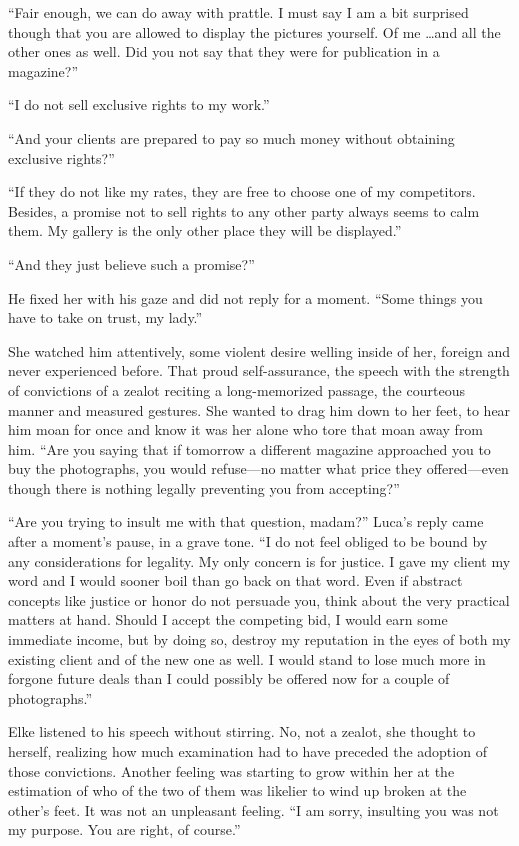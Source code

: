 ``Fair enough, we can do away with prattle. I must say I am a bit surprised though that you are allowed to display the pictures yourself. Of me \ldots and all the other ones as well. Did you not say that they were for publication in a magazine?''

``I do not sell exclusive rights to my work.''

``And your clients are prepared to pay so much money without obtaining exclusive rights?''

``If they do not like my rates, they are free to choose one of my competitors. Besides, a promise not to sell rights to any other party always seems to calm them. My gallery is the only other place they will be displayed.''

``And they just believe such a promise?''

He fixed her with his gaze and did not reply for a moment. ``Some things you have to take on trust, my lady.''

She watched him attentively, some violent desire welling inside of her, foreign and never experienced before. That proud self-assurance, the speech with the strength of convictions of a zealot reciting a long-memorized passage, the courteous manner and measured gestures. She wanted to drag him down to her feet, to hear him moan for once and know it was her alone who tore that moan away from him. ``Are you saying that if tomorrow a different magazine approached you to buy the photographs, you would refuse---no matter what price they offered---even though there is nothing legally preventing you from accepting?''

``Are you trying to insult me with that question, madam?'' Luca's reply came after a moment's pause, in a grave tone. ``I do not feel obliged to be bound by any considerations for legality. My only concern is for justice. I gave my client my word and I would sooner boil than go back on that word. Even if abstract concepts like justice or honor do not persuade you, think about the very practical matters at hand. Should I accept the competing bid, I would earn some immediate income, but by doing so, destroy my reputation in the eyes of both my existing client and of the new one as well. I would stand to lose much more in forgone future deals than I could possibly be offered now for a couple of photographs.''

Elke listened to his speech without stirring. No, not a zealot, she thought to herself, realizing how much examination had to have preceded the adoption of those convictions. Another feeling was starting to grow within her at the estimation of who of the two of them was likelier to wind up broken at the other's feet. It was not an unpleasant feeling. ``I am sorry, insulting you was not my purpose. You are right, of course.''

